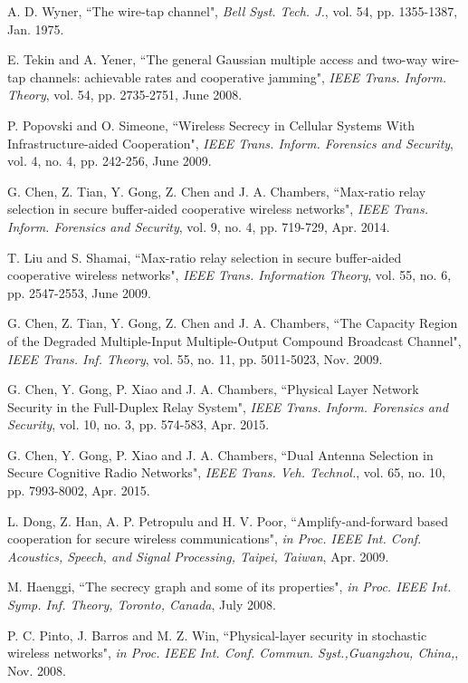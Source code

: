 \documentclass[10pt]{IEEEtran}
\begin{document}
\begin{thebibliography}{9}
A. D. Wyner, ``The wire-tap channel", \textit{Bell Syst. Tech. J.}, vol. 54, pp. 1355-1387, Jan. 1975.

E. Tekin and A. Yener, ``The general Gaussian multiple access and two-way wire-tap channels: achievable rates and cooperative jamming", \textit{IEEE Trans. Inform. Theory}, vol. 54, pp. 2735-2751, June 2008.

P. Popovski and O. Simeone, ``Wireless Secrecy in Cellular Systems With Infrastructure-aided Cooperation", \textit{IEEE Trans. Inform. Forensics and Security}, vol. 4, no. 4, pp. 242-256, June 2009.

G. Chen, Z. Tian, Y. Gong, Z. Chen and J. A. Chambers, ``Max-ratio relay selection in secure buffer-aided cooperative wireless networks", \textit{IEEE Trans. Inform. Forensics and Security}, vol. 9, no. 4, pp. 719-729, Apr. 2014.

T. Liu and S. Shamai, ``Max-ratio relay selection in secure buffer-aided cooperative wireless networks", \textit{IEEE Trans. Information Theory}, vol. 55, no. 6, pp. 2547-2553, June 2009.

G. Chen, Z. Tian, Y. Gong, Z. Chen and J. A. Chambers, ``The Capacity Region of the Degraded Multiple-Input Multiple-Output Compound Broadcast Channel", \textit{IEEE Trans. Inf. Theory}, vol. 55, no. 11, pp. 5011-5023, Nov. 2009.


G. Chen, Y. Gong, P. Xiao and J. A. Chambers, ``Physical Layer Network Security in the Full-Duplex Relay System", \textit{IEEE Trans. Inform. Forensics and Security}, vol. 10, no. 3, pp. 574-583, Apr. 2015.

G. Chen, Y. Gong, P. Xiao and J. A. Chambers, ``Dual Antenna Selection in Secure Cognitive Radio Networks", \textit{IEEE Trans. Veh. Technol.}, vol. 65, no. 10, pp. 7993-8002, Apr. 2015.


L. Dong, Z. Han, A. P. Petropulu and H. V. Poor, ``Amplify-and-forward based cooperation for secure wireless communications", \textit{in Proc. IEEE Int. Conf. Acoustics, Speech, and Signal Processing, Taipei, Taiwan}, Apr. 2009.

M. Haenggi, ``The secrecy graph and some of its properties", \textit{in Proc. IEEE Int. Symp. Inf. Theory, Toronto, Canada}, July 2008.


P. C. Pinto, J. Barros and M. Z. Win, ``Physical-layer security in stochastic wireless networks", \textit{in Proc. IEEE Int. Conf. Commun. Syst.,Guangzhou, China,}, Nov. 2008.



\end{thebibliography}
\end{document}
